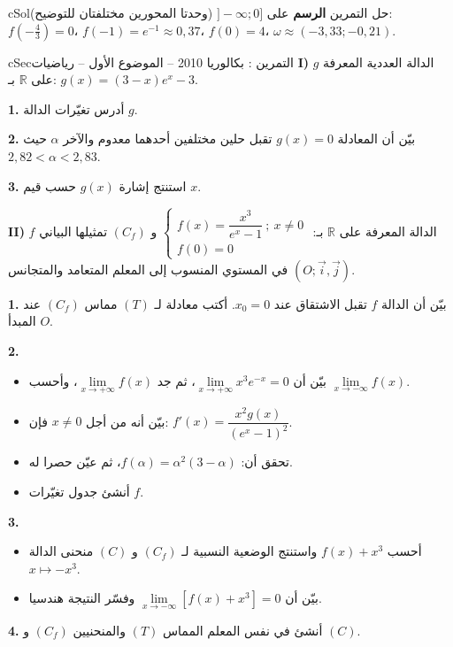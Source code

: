 \documentclass[12pt,a4paper]{article}
\newenvironment{BOX}[2]{\begin{otherlanguage}{english}\begin{arbox}{#1}{#2}}{\end{arbox}\end{otherlanguage}}
\newcounter{exo}
\newenvironment{tamrin}[1]{\stepcounter{exo}\begin{BOX}{cSec}{التمرين \theexo: #1}}{\end{BOX}}
\newenvironment{hal}{\Needspace{12\baselineskip}\begin{otherlanguage}{english}\begin{arbox}[breakable]{cSol}{حل التمرين \theexo}}{\end{arbox}\end{otherlanguage}}
\newenvironment{LTR}{\begin{otherlanguage}{english}}{\end{otherlanguage}}
\newcommand{\R}{\mathbb{R}}
\newenvironment{sq}{\begin{itemize}[leftmargin=2.4em,itemsep=3pt]}{\end{itemize}}
\newcommand{\qa}{\item[(أ)]}\newcommand{\qb}{\item[(ب)]}\newcommand{\qc}{\item[(جـ)]}\newcommand{\qd}{\item[(د)]}\newcommand{\qe}{\item[(هـ)]}
\newcommand{\QQ}[1]{\par\smallskip\textbf{#1.} }
\begin{document}
\begin{hal}
\pc \textbf{الرسم} على $]{-}\infty;0]$ (وحدتا المحورين مختلفتان للتوضيح): $f\left(-\tfrac43\right)=0$، $f(-1)=e^{-1}\approx0{,}37$، $f(0)=4$، $\omega\approx(-3{,}33;-0{,}21)$.
\begin{center}\begin{LTR}\end{LTR}\end{center}
\end{hal}

\begin{tamrin}{بكالوريا 2010 -- الموضوع الأول -- رياضيات}
\textbf{I)} $g$ الدالة العددية المعرفة على $\R$ بـ: $g(x)=(3-x)e^{x}-3$.
\QQ{1} أدرس تغيّرات الدالة $g$.
\QQ{2} بيّن أن المعادلة $g(x)=0$ تقبل حلين مختلفين أحدهما معدوم والآخر $\alpha$ حيث $2{,}82<\alpha<2{,}83$.
\QQ{3} استنتج إشارة $g(x)$ حسب قيم $x$.

\textbf{II)} $f$ الدالة المعرفة على $\R$ بـ: $\begin{cases} f(x)=\dfrac{x^3}{e^{x}-1}\ ;\ x\neq0\\[4pt] f(0)=0\end{cases}$
و $(C_f)$ تمثيلها البياني في المستوي المنسوب إلى المعلم المتعامد والمتجانس $(O;\vec i,\vec j)$.
\QQ{1} بيّن أن الدالة $f$ تقبل الاشتقاق عند $x_0=0$. أكتب معادلة لـ $(T)$ مماس $(C_f)$ عند المبدأ $O$.
\QQ{2}
\begin{sq}
\qa بيّن أن $\lim\limits_{x\to+\infty}x^3e^{-x}=0$، ثم جد $\lim\limits_{x\to+\infty}f(x)$، وأحسب $\lim\limits_{x\to-\infty}f(x)$.
\qb بيّن أنه من أجل $x\neq0$ فإن: $f'(x)=\dfrac{x^2g(x)}{(e^{x}-1)^2}$.
\qc تحقق أن: $f(\alpha)=\alpha^2(3-\alpha)$، ثم عيّن حصرا له.
\qd أنشئ جدول تغيّرات $f$.
\end{sq}
\QQ{3}
\begin{sq}
\qa أحسب $f(x)+x^3$ واستنتج الوضعية النسبية لـ $(C_f)$ و $(C)$ منحنى الدالة $x\mapsto-x^3$.
\qb بيّن أن $\lim\limits_{x\to-\infty}\left[f(x)+x^3\right]=0$ وفسّر النتيجة هندسيا.
\end{sq}
\QQ{4} أنشئ في نفس المعلم المماس $(T)$ والمنحنيين $(C_f)$ و $(C)$.
\end{tamrin}
\end{document}
